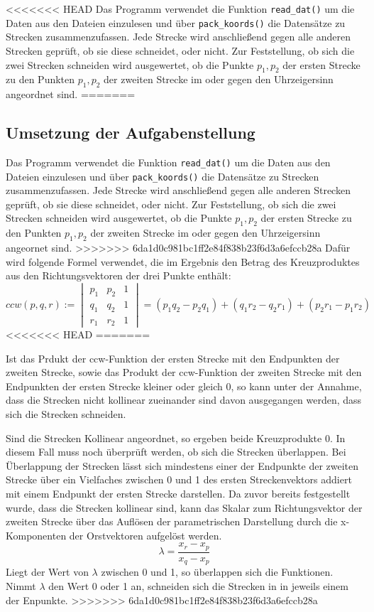 \documentclass[12pt]{scrartcl}
\newcommand{\code}[1]{\texttt{#1}}
\begin{document}
<<<<<<< HEAD
Das Programm verwendet die Funktion \code{read\_dat()} um die Daten aus den Dateien einzulesen und über \code{pack\_koords()} die Datensätze zu Strecken zusammenzufassen.
Jede Strecke wird anschließend gegen alle anderen Strecken geprüft, ob sie diese schneidet, oder nicht.
Zur Feststellung, ob sich die zwei Strecken schneiden wird ausgewertet, ob die Punkte $p_1, p_2$ der ersten Strecke zu den Punkten $p_1, p_2$ der zweiten Strecke im oder gegen den Uhrzeigersinn angeordnet sind.
=======
\subsection{Umsetzung der Aufgabenstellung}

Das Programm verwendet die Funktion \code{read\_dat()} um die Daten aus den Dateien einzulesen und über \code{pack\_koords()} die Datensätze zu Strecken zusammenzufassen.
Jede Strecke wird anschließend gegen alle anderen Strecken geprüft, ob sie diese schneidet, oder nicht.
Zur Feststellung, ob sich die zwei Strecken schneiden wird ausgewertet, ob die Punkte $p_1, p_2$ der ersten Strecke zu den Punkten $p_1, p_2$ der zweiten Strecke im oder gegen den Uhrzeigersinn angeornet sind.
>>>>>>> 6da1d0c981bc1ff2e84f838b23f6d3a6efccb28a
Dafür wird folgende Formel verwendet, die im Ergebnis den Betrag des Kreuzproduktes aus den Richtungsvektoren der drei Punkte enthält:
\begin{equation}
    ccw(p, q, r) := \begin{vmatrix} p_1 & p_2 & 1 \\ q_1 & q_2 & 1 \\ r_1 & r_2 & 1 \end{vmatrix} = (p_1q_2 - p_2q_1) + (q_1r_2 - q_2r_1) + (p_2r_1 - p_1r_2)
\end{equation}
<<<<<<< HEAD
=======

Ist das Prdukt der ccw-Funktion der ersten Strecke mit den Endpunkten der zweiten Strecke, sowie das Produkt der ccw-Funktion der zweiten Strecke mit den Endpunkten der ersten Strecke kleiner oder gleich 0, so kann unter der Annahme, dass die Strecken nicht kollinear zueinander sind davon ausgegangen werden, dass sich die Strecken schneiden.

Sind die Strecken Kollinear angeordnet, so ergeben beide Kreuzprodukte 0. In diesem Fall muss noch überprüft werden, ob sich die Strecken überlappen.
Bei Überlappung der Strecken lässt sich mindestens einer der Endpunkte der zweiten Strecke über ein Vielfaches zwischen 0 und 1 des ersten Streckenvektors addiert mit einem Endpunkt der ersten Strecke darstellen.
Da zuvor bereits festgestellt wurde, dass die Strecken kollinear sind, kann das Skalar zum Richtungsvektor der zweiten Strecke über das Auflösen der parametrischen Darstellung durch die x-Komponenten der Orstvektoren aufgelöst werden.
\begin{equation}
    \lambda = \frac{x_r - x_p}{x_q - x_p}
\end{equation}
Liegt der Wert von $\lambda$ zwischen 0 und 1, so überlappen sich die Funktionen. Nimmt $\lambda$ den Wert 0 oder 1 an, schneiden sich die Strecken in in jeweils einem der Enpunkte.
>>>>>>> 6da1d0c981bc1ff2e84f838b23f6d3a6efccb28a
\end{document}
